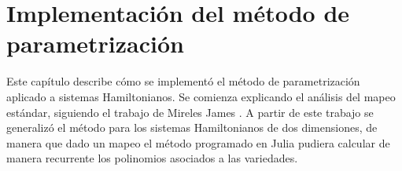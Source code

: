 
\chapter{Implementación del método de parametrización}
Este capítulo describe cómo se implementó el método de parametrización aplicado a sistemas Hamiltonianos. Se comienza explicando el análisis del mapeo es\-tán\-dar, siguiendo el trabajo de Mireles James \cite{Mireles}. A partir de este trabajo se generalizó el método para los sistemas Hamiltonianos de dos dimensiones, de manera que dado un mapeo el método programado en Julia pudiera calcular de manera recurrente los polinomios asociados a las variedades.
